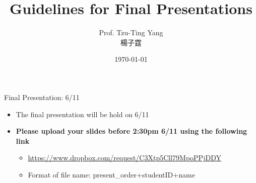 \documentclass[dvipsnames,hyperref={pdfpagelabels=false}]{beamer}
\title[]  
{Guidelines for Final Presentations}
\author 
{Prof. Tzu-Ting Yang  \\ 楊子霆}
\institute{Institute of Economics, Academia Sinica  \\ 中央研究院經濟研究所}
\date
{\today}
\begin{document}
\begin{frame}{}
 \titlepage
\end{frame}


\begin{frame}{Final Presentation: 6/11}
	\begin{itemize}
		
		\item The final presentation will be hold on 6/11
		\vspace{0.2cm} 
%				
	   \item \textbf{Please upload your slides before 2:30pm 6/11  using the following link}
	   \vspace{0.2cm}
	   \begin{itemize}
	   	\item \url{https://www.dropbox.com/request/C3Xtp5Cll79MpoPPjDDY}
	   	\vspace{0.2cm}
	   	\item Format of file name: present\_order+studentID+name

\end{itemize}
\end{itemize}
\end{frame}
\end{document}

